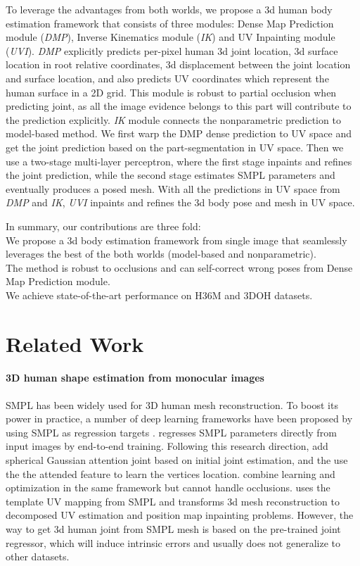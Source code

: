 \documentclass[10pt,twocolumn,letterpaper]{article}
\begin{document}
To leverage the advantages from both worlds, we propose a 3d human body estimation framework that consists of three modules: Dense Map Prediction module (\textit{DMP}), Inverse Kinematics module (\textit{IK}) and UV Inpainting module (\textit{UVI}). \textit{DMP} explicitly predicts per-pixel human 3d joint location, 3d surface location in root relative coordinates, 3d displacement between the joint location and surface location, and also predicts UV coordinates which represent the human surface in a 2D grid. This module is robust to partial occlusion when predicting joint, as all the image evidence belongs to this part will contribute to the prediction explicitly. \textit{IK} module connects the nonparametric prediction to model-based method.  We first warp the DMP dense prediction to UV space and get the joint prediction based on the part-segmentation in UV space. Then we use a two-stage multi-layer perceptron, where the first stage inpaints and refines the joint prediction, while the second stage estimates SMPL parameters and eventually produces a posed mesh. With all the predictions in UV space from \textit{DMP} and \textit{IK}, \textit{UVI} inpaints and refines the 3d body pose and mesh in UV space.

\noindent In summary, our contributions are three fold:
\\
 We propose a 3d body estimation framework from single image that seamlessly leverages the best of the both worlds (model-based and nonparametric). 
\\
 The method is robust to occlusions and can self-correct wrong poses from Dense Map Prediction module.
\\
 We achieve state-of-the-art performance on H36M and 3DOH datasets. 



\section{Related Work}


\paragraph{3D human shape estimation from monocular images}  SMPL \cite{smpl} has been widely used for 3D human mesh reconstruction. To boost its power in practice, a number of deep learning frameworks have been proposed by using SMPL as regression targets \cite{HMR,spin, SMPL-X:2019,decomr,I2L,pchmr}. \cite{HMR} regresses SMPL parameters directly from input images by end-to-end training. Following this research direction, \cite{I2L} add spherical Gaussian attention joint based on initial joint estimation, and the use the the attended feature to learn the vertices location. \cite{spin} combine learning and optimization\cite{SMPL-X:2019} in the same framework but cannot handle occlusions. \cite{decomr} uses the template UV mapping from SMPL and transforms 3d mesh reconstruction to decomposed UV estimation and position map inpainting problems. However, the way to get 3d human joint from SMPL mesh is based on the pre-trained joint regressor, which will induce intrinsic errors and usually does not generalize to other datasets.
\end{document}
